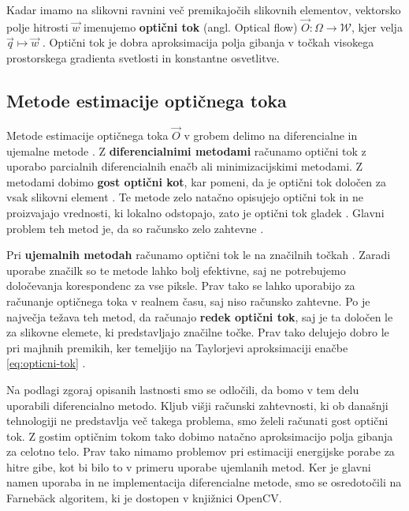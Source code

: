 Kadar imamo na slikovni ravnini več premikajočih slikovnih elementov, vektorsko polje hitrosti $\vec{w}$ imenujemo \textbf{optični tok} (angl. Optical flow) $\vec{O}: \mathit{\Omega} \to \mathcal{W}$, kjer velja $ \vec{q} \mapsto \vec{w}$ \cite{trucco1998introductory}. Optični tok je dobra aproksimacija polja gibanja v točkah visokega prostorskega gradienta svetlosti in konstantne osvetlitve.



\subsection{Metode estimacije optičnega toka}

Metode estimacije optičnega toka $\vec{O}$ v grobem delimo na diferencialne in {ujemalne} metode \cite{trucco1998introductory}. Z \textbf{diferencialnimi metodami} računamo optični tok z uporabo parcialnih diferencialnih enačb ali minimizacijskimi metodami. Z metodami dobimo \textbf{gost optični kot}, kar pomeni, da je optični tok določen za vsak slikovni element \cite{trucco1998introductory}. Te metode zelo natačno opisujejo optični tok in ne proizvajajo vrednosti, ki lokalno odstopajo, zato je optični tok gladek \cite{brox2011large}.  Glavni problem teh metod je, da so računsko zelo zahtevne \cite{trucco1998introductory}.

Pri \textbf{ujemalnih metodah} računamo optični tok le na značilnih točkah \cite{trucco1998introductory}. Zaradi uporabe značilk so te metode lahko bolj efektivne, saj ne potrebujemo določevanja korespondenc za vse piksle. Prav tako se lahko uporabijo za računanje optičnega toka v realnem času, saj niso računsko zahtevne. Po \cite{trucco1998introductory} je največja težava teh metod, da računajo \textbf{redek optični tok}, saj je ta določen le za slikovne elemete, ki predstavljajo značilne točke. Prav tako delujejo dobro le pri majhnih premikih, ker temeljijo na Taylorjevi aproksimaciji enačbe \eqref{eq:opticni-tok} \cite{wedel2011stereo}. 

Na podlagi zgoraj opisanih lastnosti smo se odločili, da bomo v tem delu uporabili diferencialno metodo. Kljub višji računski zahtevnosti, ki ob današnji tehnologiji ne predstavlja več takega problema, smo želeli računati gost optični tok. Z gostim optičnim tokom tako dobimo natačno aproksimacijo polja gibanja za celotno telo. Prav tako nimamo problemov pri estimaciji energijske porabe za hitre gibe, kot bi bilo to v primeru uporabe ujemlanih metod. Ker je glavni namen uporaba in ne implementacija diferencialne metode, smo se osredotočili na Farneb{\"a}ck algoritem, ki je dostopen v knjižnici OpenCV.

